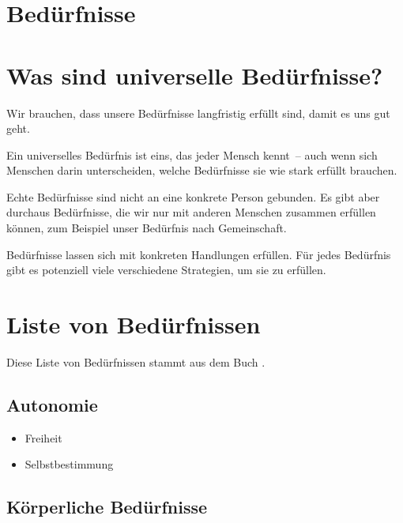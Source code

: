 \section{Bedürfnisse}

\section{Was sind universelle Bedürfnisse?}

Wir brauchen, dass unsere Bedürfnisse langfristig erfüllt sind, damit es uns gut geht.

Ein universelles Bedürfnis ist eins, das jeder Mensch kennt~-- auch wenn sich Menschen darin unterscheiden, welche Bedürfnisse sie wie stark erfüllt brauchen.

Echte Bedürfnisse sind nicht an eine konkrete Person gebunden. Es gibt aber durchaus Bedürfnisse, die wir nur mit anderen Menschen zusammen erfüllen können, zum Beispiel unser Bedürfnis nach Gemeinschaft.

Bedürfnisse lassen sich mit konkreten Handlungen erfüllen. Für jedes Bedürfnis gibt es potenziell viele verschiedene Strategien, um sie zu erfüllen.

\section{Liste von Bedürfnissen}

Diese Liste von Bedürfnissen stammt aus dem Buch \cite[S. 75f]{gfk-dummies}.

\subsection{Autonomie}

\begin{multicols}{2}
  \begin{itemize}
    \item Freiheit
    \item Selbstbestimmung
  \end{itemize}
\end{multicols}


\subsection{Körperliche Bedürfnisse}


